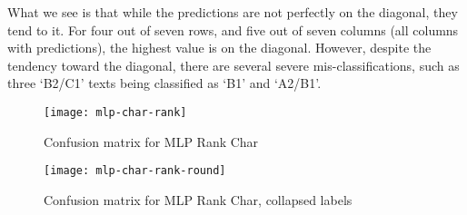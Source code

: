 What we see is that while the predictions are not perfectly on the diagonal,
they tend to it. For four out of seven rows, and five out of seven columns
(all columns with predictions), the highest value is on the diagonal.
However, despite the tendency toward the diagonal, there are several severe
mis-classifications, such as three `B2/C1' texts being classified as `B1' and
`A2/B1'.

\begin{figure}
  \centering
  \texttt{[image: mlp-char-rank]}
  \caption{Confusion matrix for MLP Rank Char}
  \label{fig:mlp-char-rank}
\end{figure}

\begin{figure}
  \centering
  \texttt{[image: mlp-char-rank-round]}
  \caption{Confusion matrix for MLP Rank Char, collapsed labels}
  \label{fig:mlp-char-rank-round}
\end{figure}
